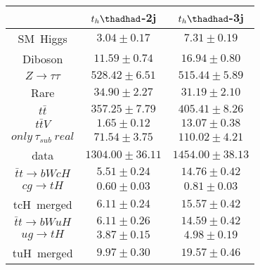 \centering
\begin{tabular}{|c|c|c|} \hline
 & $t_{h}\thadhad$-2j & $t_{h}\thadhad$-3j\\\hline
SM~Higgs & $3.04\pm0.17$ & $7.31\pm0.19$\\\hline
Diboson & $11.59\pm0.74$ & $16.94\pm0.80$\\\hline
$Z\to\tau\tau$ & $528.42\pm6.51$ & $515.44\pm5.89$\\\hline
Rare & $34.90\pm2.27$ & $31.19\pm2.10$\\\hline
$t\bar{t}$ & $357.25\pm7.79$ & $405.41\pm8.26$\\\hline
$t\bar{t}V$ & $1.65\pm0.12$ & $13.07\pm0.38$\\\hline
$only~\tau_{sub}~real$ & $71.54\pm3.75$ & $110.02\pm4.21$\\\hline
data & $1304.00\pm36.11$ & $1454.00\pm38.13$\\\hline
$\bar{t}t\to bWcH$ & $5.51\pm0.24$ & $14.76\pm0.42$\\\hline
$cg\to tH$ & $0.60\pm0.03$ & $0.81\pm0.03$\\\hline
tcH~merged & $6.11\pm0.24$ & $15.57\pm0.42$\\\hline
$\bar{t}t\to bWuH$ & $6.11\pm0.26$ & $14.59\pm0.42$\\\hline
$ug\to tH$ & $3.87\pm0.15$ & $4.98\pm0.19$\\\hline
tuH~merged & $9.97\pm0.30$ & $19.57\pm0.46$\\\hline
\end{tabular}